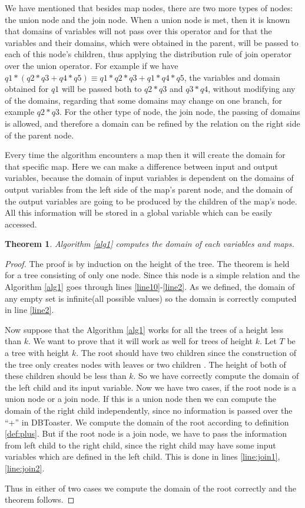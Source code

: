 \documentclass[12pt]{article}
\newtheorem{theorem}{Theorem}
\begin{document}
	We have mentioned that besides map nodes, there are two more types of nodes: the union node and the join node. When a union node is met, then it is known that domains of variables will not pass over this operator and for that the variables and their domains, which were obtained in the parent, will be passed to each of this node's children, thus applying the distribution rule of join operator over the union operator. For example if we have $ q1 * (q2 * q3 + q4 * q5) \equiv q1 * q2 * q3 + q1 * q4 * q5$, the variables and domain obtained for $q1$ will be passed both to $q2*q3$ and $q3*q4$, without modifying any of the domains, regarding that some domains may change on one branch, for example $q2*q3$. For the other type of node, the join node, the passing of domains is allowed, and therefore a domain can be refined by the relation on the right side of the parent node.
	
	Every time the algorithm encounters a map then it will create the domain for that specific map. Here we can make a difference between input and output variables, because the domain of input variables is dependent on the domains of output variables from the left side of the map's parent node, and the domain of the output variables are going to be produced by the children of the map's node. All this information will be stored in a global variable which can be easily accessed.
\begin{theorem}
Algorithm \ref{alg1} computes the domain of each variables and maps.
\end{theorem}

\begin{proof}

The proof is by induction on the height of the tree. The theorem is held for a tree consisting of only one node. Since this node is a simple relation and the Algorithm \ref{alg1} goes  through lines \ref{line10}-\ref{line2}. As we defined, the domain of any empty set is infinite(all possible values) so the domain is correctly computed in line \ref{line2}.

Now suppose that the Algorithm \ref{alg1} works for all the trees of a height less than $k$. We want to prove that it will work as well for trees of height $k$. Let $T$ be a tree with height $k$. The root should have two children since the construction of the tree only creates nodes with leaves or two children \cite{1}. The height of both of these children should be less than $k$. So we have correctly compute the domain of the left child and its input variable. Now we have two cases, if the root node is a union node or a join node. If this is a union node then we can compute the domain of the right child independently, since no information is passed over the ``+'' in DBToaster\cite{1}. We compute the domain of the root according to definition \eqref{def:plus}. But if the root node is a join node, we have to pass the information from left child to the right child, since the right child may have some input variables which are defined in the left child. This is done in lines \ref{line:join1},\ref{line:join2}.\par
Thus in either of two cases we compute the domain of the root correctly and the theorem follows.
\end{proof}
\end{document}
